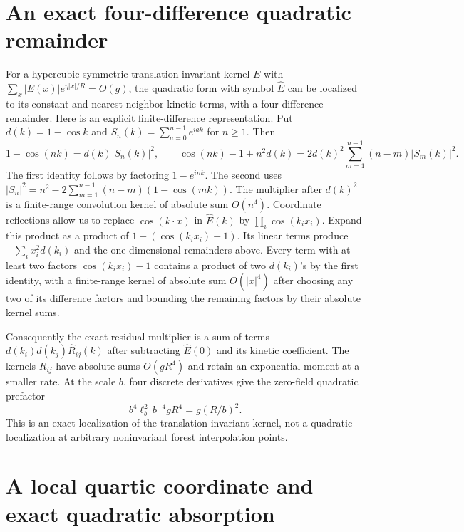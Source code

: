 \documentclass[11pt]{article}
\begin{document}
\section{An exact four-difference quadratic remainder}

For a hypercubic-symmetric translation-invariant kernel \(E\) with
\(\sum_x|E(x)|e^{\eta|x|/R}=O(g)\), the quadratic form with symbol
\(\widehat E\) can be localized to its constant and nearest-neighbor
kinetic terms, with a four-difference remainder. Here is an
explicit finite-difference representation. Put
\(d(k)=1-\cos k\) and \(S_n(k)=\sum_{a=0}^{n-1}e^{iak}\) for
\(n\ge1\). Then
\[
 1-\cos(nk)=d(k)|S_n(k)|^2,\qquad
 \cos(nk)-1+n^2d(k)
   =2d(k)^2\sum_{m=1}^{n-1}(n-m)|S_m(k)|^2 .
\]
The first identity follows by factoring \(1-e^{ink}\). The second
uses \(|S_n|^2=n^2-2\sum_{m=1}^{n-1}(n-m)(1-\cos(mk))\).
The multiplier after \(d(k)^2\) is a finite-range convolution
kernel of absolute sum \(O(n^4)\). Coordinate reflections allow
us to replace \(\cos(k\cdot x)\) in \(\widehat E(k)\) by
\(\prod_i\cos(k_i x_i)\). Expand this product as a product of
\(1+(\cos(k_i x_i)-1)\). Its linear terms produce
\(-\sum_i x_i^2d(k_i)\) and the one-dimensional remainders above.
Every term with at least two factors \(\cos(k_i x_i)-1\)
contains a product of two \(d(k_i)\)'s by the first identity,
with a finite-range kernel of absolute sum \(O(|x|^4)\)
after choosing any two of its difference factors and bounding
the remaining factors by their absolute kernel sums.

Consequently the exact residual multiplier is a sum of
terms \(d(k_i)d(k_j)\widehat R_{ij}(k)\) after subtracting
\(\widehat E(0)\) and its kinetic coefficient. The kernels
\(R_{ij}\) have absolute sums \(O(g R^4)\) and retain an
exponential moment at a smaller rate. At the scale \(b\),
four discrete derivatives give the zero-field quadratic
prefactor
\[
 b^4\ell_b^2\,b^{-4}gR^4=g(R/b)^2 .
\]
This is an exact localization of the translation-invariant
kernel, not a quadratic localization at arbitrary noninvariant
forest interpolation points.


\section{A local quartic coordinate and exact quadratic absorption}
\end{document}
